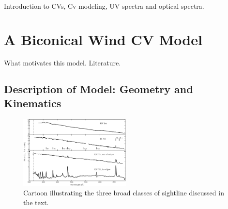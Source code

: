 \documentclass[preprint, a4paper, 11pt]{aastex}
\begin{document}

Introduction to CVs, Cv modeling, UV spectra and optical spectra. 



\newpage
%
%

\section{A Biconical Wind CV Model}

What motivates this model. Literature. 

\subsection{Description of Model: Geometry and Kinematics}
\begin{figure}
\centering
\includegraphics[width=0.5\textwidth]{figures/fig1.eps}
\caption{Cartoon illustrating the three broad classes of sightline discussed in the text.}
\label{cartoon}
\end{figure}
\end{document}
